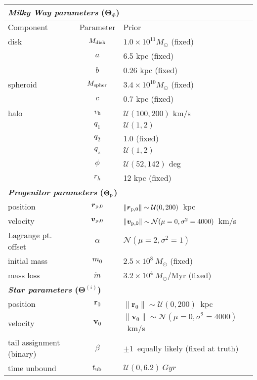 \documentclass[letterpaper,12pt,preprint]{aastex}
\newcommand{\bs}{\boldsymbol}
\newcommand{\sat}{{\rm p}}
\newcommand{\tub}{t_{\rm ub}}
\newcommand{\tint}{t_{\rm int}}
\newcommand{\vhalo}{v_{\rm h}}
\begin{document}
\begin{table}[h]
\begin{center}
	\begin{tabular}{l c l} \toprule
		\multicolumn{3}{l}{{\bf \emph{Milky Way parameters} ($\bs{\Theta}_\Phi$)}} \\
		\toprule
		Component & Parameter & Prior \\\toprule
		disk & $M_{\rm disk}$ & $1.0\times10^{11}M_\odot$ (fixed) \\ 
		& $a$ & 6.5 kpc (fixed)\\
		& $b$ & 0.26 kpc (fixed)\\
		\midrule
		spheroid & $M_{\rm spher}$ & $3.4\times10^{10}M_\odot$ (fixed)\\ 
		& $c$ & 0.7 kpc (fixed)\\
		\midrule
		halo & $\vhalo$ & $\mathcal{U}(100,200)$ km/s \\
		& $q_1$ & $\mathcal{U}(1,2)$\\
		& $q_2$ & 1.0 (fixed)\\
		& $q_z$ & $\mathcal{U}(1,2)$\\
		& $\phi$ & $\mathcal{U}(52,142)$ deg\\
		& $r_h$ & 12 kpc (fixed)\\
		\toprule
		\multicolumn{3}{l}{{\bf \emph{Progenitor parameters} ($\bs{\Theta}_\sat$)}} \\
		\toprule
		position & $\bs{r}_{\sat,0}$ & $\|\bs{r}_{\sat,0}\|\sim\mathcal{U}(0,200)$~kpc \\
		velocity & $\bs{v}_{\sat,0}$ & $\|\bs{v}_{\sat,0}\|\sim\mathcal{N}(\mu=0,\sigma^2=4000)$~km/s\\
		Lagrange pt. offset & $\alpha$ & $\mathcal{N}(\mu=2,\sigma^2=1)$\\
		initial mass & $m_0$ & $2.5\times10^8~M_\odot$ (fixed)\\
		mass loss & $\dot{m}$ & $3.2\times10^4~M_\odot$/Myr (fixed)\\
		\toprule
		\multicolumn{3}{l}{{\bf \emph{Star parameters} ($\bs{\Theta}^{(i)}$)}} \\
		\toprule
		position & $\bs{r}_0$ & $\|\bs{r}_0\|\sim\mathcal{U}(0,200)$~kpc \\
		velocity & $\bs{v}_0$ & $\|\bs{v}_0\|\sim\mathcal{N}(\mu=0,\sigma^2=4000)$~km/s\\
		tail assignment (binary) & $\beta$ & $\pm1$~equally likely (fixed at truth)\\ %
		time unbound & $\tub$ & $\mathcal{U}(0,6.2)~Gyr$\\ %

\end{tabular}
\end{center}
\end{table}
\end{document}
